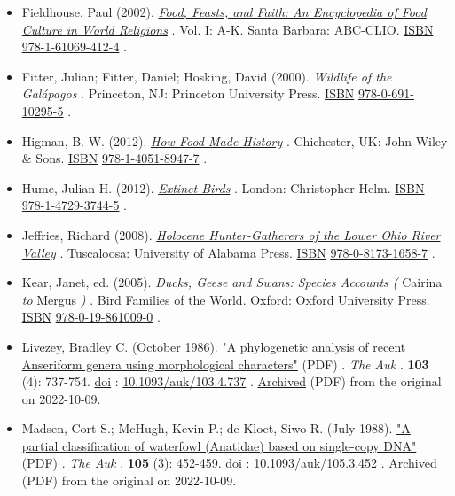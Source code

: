 \documentclass[11pt,a4paper]{article}
\begin{document}
\begin{itemize}
\item Fieldhouse, Paul (2002). \href{https://books.google.com/books?id=P-FqDgAAQBAJ\&pg=PA167}{\textit{Food, Feasts, and Faith: An Encyclopedia of Food Culture in World Religions}} . Vol. I: A-K. Santa Barbara: ABC-CLIO. \href{/wiki/ISBN\_(identifier)}{ISBN} \href{/wiki/Special:BookSources/978-1-61069-412-4}{978-1-61069-412-4} .
\item Fitter, Julian; Fitter, Daniel; Hosking, David (2000). \textit{Wildlife of the Galápagos} . Princeton, NJ: Princeton University Press. \href{/wiki/ISBN\_(identifier)}{ISBN} \href{/wiki/Special:BookSources/978-0-691-10295-5}{978-0-691-10295-5} .
\item Higman, B. W. (2012). \href{https://books.google.com/books?id=YIUoz98yMvgC\&pg=RA1-PA1801}{\textit{How Food Made History}} . Chichester, UK: John Wiley \& Sons. \href{/wiki/ISBN\_(identifier)}{ISBN} \href{/wiki/Special:BookSources/978-1-4051-8947-7}{978-1-4051-8947-7} .
\item Hume, Julian H. (2012). \href{https://books.google.com/books?id=40sxDwAAQBAJ\&pg=PA53}{\textit{Extinct Birds}} . London: Christopher Helm. \href{/wiki/ISBN\_(identifier)}{ISBN} \href{/wiki/Special:BookSources/978-1-4729-3744-5}{978-1-4729-3744-5} .
\item Jeffries, Richard (2008). \href{https://archive.org/details/holocenehunterga0000jeff/mode/2up}{\textit{Holocene Hunter-Gatherers of the Lower Ohio River Valley}} . Tuscaloosa: University of Alabama Press. \href{/wiki/ISBN\_(identifier)}{ISBN} \href{/wiki/Special:BookSources/978-0-8173-1658-7}{978-0-8173-1658-7} .
\item Kear, Janet, ed. (2005). \textit{Ducks, Geese and Swans: Species Accounts (} Cairina \textit{to} Mergus \textit{)} . Bird Families of the World. Oxford: Oxford University Press. \href{/wiki/ISBN\_(identifier)}{ISBN} \href{/wiki/Special:BookSources/978-0-19-861009-0}{978-0-19-861009-0} .
\item Livezey, Bradley C. (October 1986). \href{https://sora.unm.edu/sites/default/files/journals/auk/v103n04/p0737-p0754.pdf}{"A phylogenetic analysis of recent Anseriform genera using morphological characters"} (PDF) . \textit{The Auk} . \textbf{103} (4): 737-754. \href{/wiki/Doi\_(identifier)}{doi} : \href{https://doi.org/10.1093\%2Fauk\%2F103.4.737}{10.1093/auk/103.4.737} . \href{https://ghostarchive.org/archive/20221009/https://sora.unm.edu/sites/default/files/journals/auk/v103n04/p0737-p0754.pdf}{Archived} (PDF) from the original on 2022-10-09.
\item Madsen, Cort S.; McHugh, Kevin P.; de Kloet, Siwo R. (July 1988). \href{https://sora.unm.edu/sites/default/files/journals/auk/v105n03/p0452-p0459.pdf}{"A partial classification of waterfowl (Anatidae) based on single-copy DNA"} (PDF) . \textit{The Auk} . \textbf{105} (3): 452-459. \href{/wiki/Doi\_(identifier)}{doi} : \href{https://doi.org/10.1093\%2Fauk\%2F105.3.452}{10.1093/auk/105.3.452} . \href{https://ghostarchive.org/archive/20221009/https://sora.unm.edu/sites/default/files/journals/auk/v105n03/p0452-p0459.pdf}{Archived} (PDF) from the original on 2022-10-09.

\end{itemize}
\end{document}
